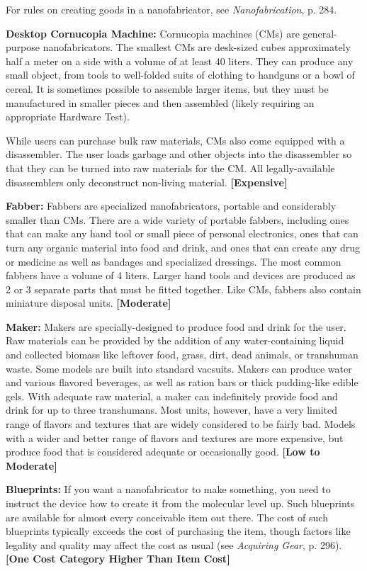 For rules on creating goods in a nanofabricator, see \textit{Nanofabrication}, p. 284. 

\textbf{Desktop Cornucopia Machine:} Cornucopia machines (CMs) are general-purpose nanofabricators. The smallest CMs are desk-sized cubes approximately half a meter on a side with a volume of at least 40 liters. They can produce any small object, from tools to well-folded suits of clothing to handguns or a bowl of cereal. It is sometimes possible to assemble larger items, but they must be manufactured in smaller pieces and then assembled (likely requiring an appropriate Hardware Test). 

While users can purchase bulk raw materials, CMs also come equipped with a disassembler. The user loads garbage and other objects into the disassembler so that they can be turned into raw materials for the CM. All legally-available disassemblers only deconstruct non-living material. \textbf{[Expensive]} 

\textbf{Fabber:} Fabbers are specialized nanofabricators, portable and considerably smaller than CMs. There are a wide variety of portable fabbers, including ones that can make any hand tool or small piece of personal electronics, ones that can turn any organic material into food and drink, and ones that can create any drug or medicine as well as bandages and specialized dressings. The most common fabbers have a volume of 4 liters. Larger hand tools and devices are produced as 2 or 3 separate parts that must be fitted together. Like CMs, fabbers also contain miniature disposal units. \textbf{[Moderate]} 

\textbf{Maker:} Makers are specially-designed to produce food and drink for the user. Raw materials can be provided by the addition of any water-containing liquid and collected biomass like leftover food, grass, dirt, dead animals, or transhuman waste. Some models are built into standard vacsuits. Makers can produce water and various flavored beverages, as well as ration bars or thick pudding-like edible gels. With adequate raw material, a maker can indefinitely provide food and drink for up to three transhumans. Most units, however, have a very limited range of flavors and textures that are widely considered to be fairly bad. Models with a wider and better range of flavors and textures are more expensive, but produce food that is considered adequate or occasionally good. \textbf{[Low to Moderate]} 

\textbf{Blueprints:} If you want a nanofabricator to make something, you need to instruct the device how to create it from the molecular level up. Such blueprints are available for almost every conceivable item out there. The cost of such blueprints typically exceeds the cost of purchasing the item, though factors like legality and quality may affect the cost as usual (see \emph{Acquiring Gear}, p. 296). \textbf{[One Cost Category Higher Than Item Cost]} 



